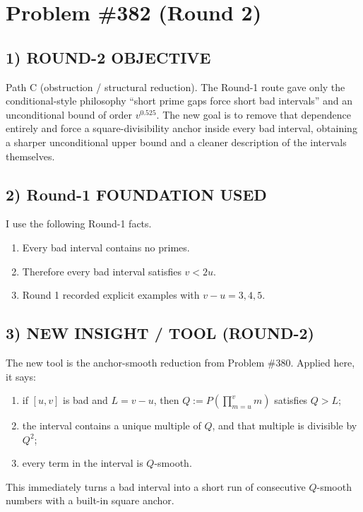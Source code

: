 
\section{Problem \#382 (Round 2)}

\subsection*{1) ROUND-2 OBJECTIVE}

Path C (obstruction / structural reduction). The Round-1 route gave only the conditional-style philosophy ``short prime gaps force short bad intervals'' and an unconditional bound of order $v^{0.525}$. The new goal is to remove that dependence entirely and force a square-divisibility anchor inside every bad interval, obtaining a sharper unconditional upper bound and a cleaner description of the intervals themselves.

\subsection*{2) Round-1 FOUNDATION USED}

I use the following Round-1 facts.

\begin{enumerate}
\item Every bad interval contains no primes.
\item Therefore every bad interval satisfies $v<2u$.
\item Round 1 recorded explicit examples with $v-u=3,4,5$.
\end{enumerate}

\subsection*{3) NEW INSIGHT / TOOL (ROUND-2)}

The new tool is the anchor-smooth reduction from Problem \#380. Applied here, it says:

\begin{enumerate}
\item if $[u,v]$ is bad and $L=v-u$, then $Q:=P\!\left(\prod_{m=u}^{v}m\right)$ satisfies $Q>L$;
\item the interval contains a unique multiple of $Q$, and that multiple is divisible by $Q^2$;
\item every term in the interval is $Q$-smooth.
\end{enumerate}

This immediately turns a bad interval into a short run of consecutive $Q$-smooth numbers with a built-in square anchor.

